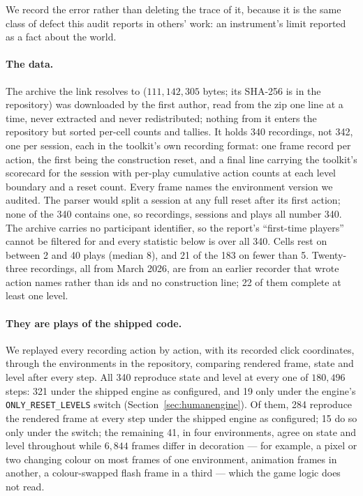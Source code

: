 \documentclass[11pt]{article}
\newcommand{\code}[1]{\texttt{#1}}
\begin{document}
We record the error rather than deleting the trace of it, because it is the
same class of defect this audit reports in others' work: an instrument's limit
reported as a fact about the world.

\paragraph{The data.} The archive the link resolves to ($111{,}142{,}305$
bytes; its SHA-256 is in the repository) was downloaded by the first author,
read from the zip one line at a time, never extracted and never redistributed;
nothing from it enters the repository but sorted per-cell counts and tallies.
It holds 340 recordings, not 342, one per session, each in the toolkit's own
recording format: one frame record per action, the first being the
construction reset, and a final line carrying the toolkit's scorecard for the
session with per-play cumulative action counts at each level boundary and a
reset count. Every frame names the environment version we audited. The
parser would split a session at any full reset after its first action; none of
the 340 contains one, so recordings, sessions and plays all number 340. The
archive carries no participant identifier, so the report's ``first-time
players'' cannot be filtered for and every statistic below is over all 340.
Cells rest on between 2 and 40 plays (median 8), and 21 of the 183 on fewer
than 5.
Twenty-three recordings, all from March 2026, are from an earlier recorder
that wrote action names rather than ids and no construction line; 22 of them
complete at least one level.

\paragraph{They are plays of the shipped code.} We replayed every recording
action by action, with its recorded click coordinates, through the
environments in the repository, comparing rendered frame, state and level
after every step. All 340 reproduce state and level at every one of
$180{,}496$ steps: 321 under the shipped engine as configured, and 19 only
under the engine's \code{ONLY\_RESET\_LEVELS} switch
(Section~\ref{sec:humanengine}). Of them, 284 reproduce the rendered frame at every step under the
shipped engine as configured; 15 do so only under the switch; the remaining 41,
in four environments, agree on state and level throughout while $6{,}844$
frames differ in decoration --- for example, a pixel or two changing colour on most frames
of one environment, animation frames in another, a colour-swapped flash frame
in a third --- which the game logic does not read.
\end{document}
